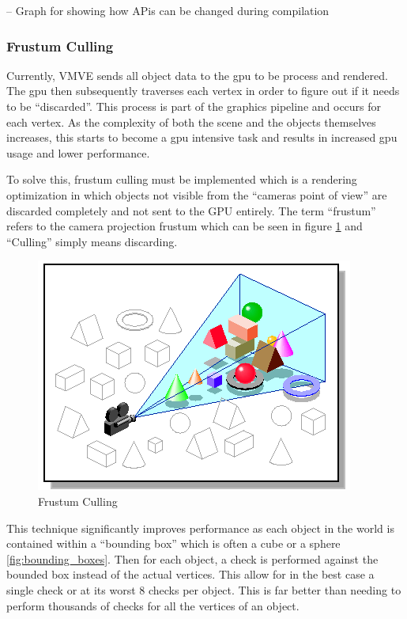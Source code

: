 \documentclass[11pt]{article}
\begin{document}
-- Graph for showing how APis can be changed during compilation

\subsubsection{Frustum Culling}
Currently, VMVE sends all object data to the \gls{gpu} to be process and rendered. The
\gls{gpu} then subsequently traverses each vertex in order to figure out if it needs
to be ``discarded''. This process is part of the graphics pipeline and occurs for
each vertex. As the complexity of both the scene and the objects themselves
increases, this starts to become a \gls{gpu} intensive task and results in increased
\gls{gpu} usage and lower performance.

To solve this, frustum culling must be implemented which is a rendering
optimization in which objects not visible from the ``cameras point of view'' are
discarded completely and not sent to the GPU entirely. The term ``frustum'' refers
to the camera projection frustum which can be seen in figure
\ref{fig:frustum_culling} and ``Culling'' simply means discarding.

\begin{figure}[h!]
  \centering
  \includegraphics[width=\textwidth]{images/frustum_culling.png}
  \caption{Frustum Culling \cite{frustum_culling}}
  \label{fig:frustum_culling}
\end{figure}


This technique significantly improves performance as each object in the world is
contained within a ``bounding box'' which is often a cube or a sphere
\ref{fig:bounding_boxes}. Then for each object, a check is performed against the
bounded box instead of the actual vertices. This allow for in the best case a
single check or at its worst 8 checks per object. This is far better than
needing to perform thousands of checks for all the vertices of an object.
\end{document}
